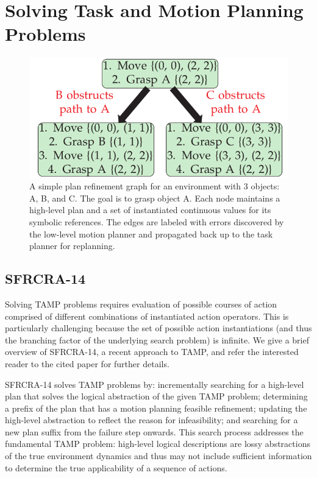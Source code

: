 \section{Solving Task and Motion Planning Problems}
\begin{figure}[t]
  \centering
    \includegraphics[scale=0.3]{images/ex_prg.png}
  \caption{\small{A simple plan refinement graph for an environment with 3 objects: A,
B, and C. The goal is to grasp object A. Each node maintains a high-level
plan and a set of instantiated continuous values for its symbolic references.
The edges are labeled with errors discovered by the low-level motion planner and
propagated back up to the task planner for replanning.}}
  \label{fig:prg}
\end{figure}

\subsection{SFRCRA-14}
Solving TAMP problems requires evaluation of
possible courses of action comprised of different combinations of
instantiated action operators. This is particularly challenging
because the set of possible action instantiations (and thus the
branching factor of the underlying search problem) is infinite.
We give a brief overview of SFRCRA-14, a recent approach to TAMP, and
refer the interested reader to the cited paper for further details.

SFRCRA-14 solves TAMP problems by: incrementally
searching for a high-level plan that solves the logical abstraction
of the given TAMP problem; determining a prefix of the plan that has a
motion planning feasible refinement; updating the high-level
abstraction to reflect the reason for infeasibility; and searching for
a new plan suffix from the failure step onwards. This search process
addresses the fundamental TAMP problem: high-level
logical descriptions are lossy abstractions of the true environment
dynamics and thus may not include sufficient information to
determine the true applicability of a sequence of actions.

